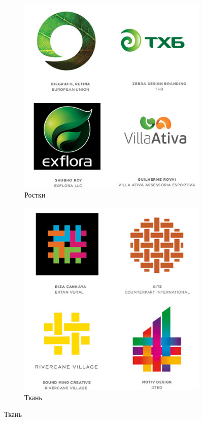 \begin{figure}[h!]
  \vfill

  \centering
  \begin{subfigure}{.45\textwidth}
    \centering
    \includegraphics[width=\linewidth]{images/supplement/logolounge/2012/Rostki}
    \caption[]{Ростки}
    \label{fig:logolounge:2012:rostki}
  \end{subfigure}
  \hfill
  \centering
  \begin{subfigure}{.45\textwidth}
    \centering
    \includegraphics[width=\linewidth]{images/supplement/logolounge/2012/tkan'}
    \caption[]{Ткань}
    \label{fig:logolounge:2012:tkan'}
  \end{subfigure}
\end{figure}

